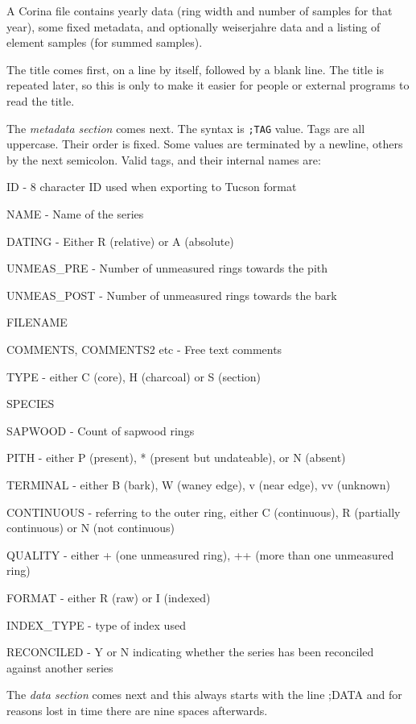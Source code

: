 \documentclass[10pt, headsepline,DIV14,BCOR0.5cm]{scrreprt}
\begin{document}
A Corina file contains yearly data (ring width and number of samples for that year), some fixed metadata, and optionally weiserjahre data and a listing of element samples (for summed samples).

The title comes first, on a line by itself, followed by a blank line. The title is repeated later, so this is only to make it easier for people or external programs to read the title.

The \emph{metadata section} comes next. The syntax is \verb|;TAG| value. Tags are all uppercase. Their order is fixed. Some values are terminated by a newline, others by the next semicolon. Valid tags, and their internal names are: 

\begin{itemize*}
 \item ID - 8 character ID used when exporting to Tucson format
\item  NAME - Name of the series
\item  DATING - Either R (relative) or A (absolute)
\item  UNMEAS\_PRE - Number of unmeasured rings towards the pith
\item  UNMEAS\_POST - Number of unmeasured rings towards the bark
\item  FILENAME
\item  COMMENTS, COMMENTS2 etc - Free text comments
\item  TYPE - either C (core), H (charcoal) or S (section)
\item  SPECIES
\item  SAPWOOD - Count of sapwood rings
\item  PITH - either P (present), * (present but undateable), or N (absent)
\item  TERMINAL - either B (bark), W (waney edge), v (near edge), vv (unknown)
\item  CONTINUOUS - referring to the outer ring, either C (continuous), R (partially continuous) or N (not continuous)
\item  QUALITY - either + (one unmeasured ring), ++ (more than one unmeasured ring)
\item  FORMAT - either R (raw) or I (indexed)
\item  INDEX\_TYPE - type of index used
\item  RECONCILED - Y or N indicating whether the series has been reconciled against another series 
\end{itemize*}

The \emph{data section} comes next and this always starts with the line ;DATA and for reasons lost in time there are nine spaces afterwards.
\end{document}
